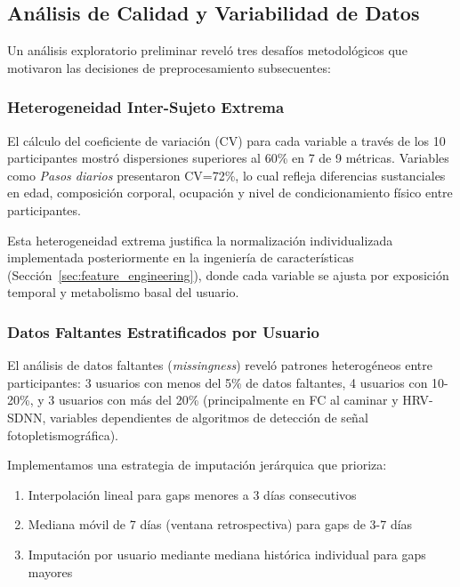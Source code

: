 \subsection{Análisis de Calidad y Variabilidad de Datos}
\label{subsec:analisis_calidad_datos}

Un análisis exploratorio preliminar reveló tres desafíos metodológicos que motivaron las decisiones de preprocesamiento subsecuentes:

\subsubsection{Heterogeneidad Inter-Sujeto Extrema}

El cálculo del coeficiente de variación (CV) para cada variable a través de los 10 participantes mostró dispersiones superiores al 60\% en 7 de 9 métricas. Variables como \textit{Pasos diarios} presentaron CV=72\%, lo cual refleja diferencias sustanciales en edad, composición corporal, ocupación y nivel de condicionamiento físico entre participantes.

Esta heterogeneidad extrema justifica la normalización individualizada implementada posteriormente en la ingeniería de características (Sección~\ref{sec:feature_engineering}), donde cada variable se ajusta por exposición temporal y metabolismo basal del usuario.

\subsubsection{Datos Faltantes Estratificados por Usuario}

El análisis de datos faltantes (\textit{missingness}) reveló patrones heterogéneos entre participantes: 3 usuarios con menos del 5\% de datos faltantes, 4 usuarios con 10-20\%, y 3 usuarios con más del 20\% (principalmente en FC al caminar y HRV-SDNN, variables dependientes de algoritmos de detección de señal fotopletismográfica).

Implementamos una estrategia de imputación jerárquica que prioriza:
\begin{enumerate}
    \item Interpolación lineal para gaps menores a 3 días consecutivos
    \item Mediana móvil de 7 días (ventana retrospectiva) para gaps de 3-7 días
    \item Imputación por usuario mediante mediana histórica individual para gaps mayores
\end{enumerate}

